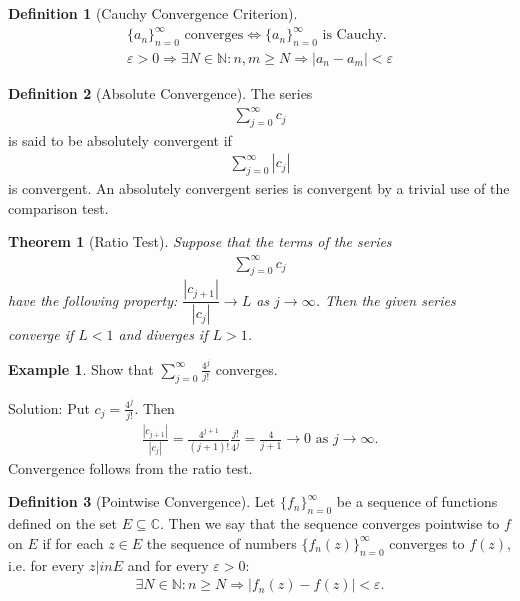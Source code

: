 \documentclass[12pt, a4paper]{article}
\theoremstyle{plain}
\newtheorem{thm}{Theorem} %
\theoremstyle{definition}
\newtheorem{definition}{Definition} %
\newtheorem{example}{Example} %
\begin{document}
			\begin{definition}[Cauchy Convergence Criterion]
				\begin{align*}
					\{a_n\}_{n=0}^{\infty}\text{ converges} \iff 
					\{a_n\}_{n=0}^{\infty}\text{ is Cauchy.}\\
					\varepsilon>0\Rightarrow \exists N\in \mathbb{N}: n,m\ge N \Rightarrow |a_n-a_m|<\varepsilon
				\end{align*}
			\end{definition}

			\begin{definition}[Absolute Convergence]
				The series
				\begin{align*}
					\sum\limits_{j=0}^{\infty}c_j
				\end{align*}
				is said to be absolutely convergent if
				\begin{align*}
					\sum\limits_{j=0}^{\infty}|c_j|
				\end{align*}
				is convergent. An absolutely convergent series is convergent by a trivial use of the comparison test.\\
			\end{definition}

			\begin{thm}[Ratio Test]
				Suppose that the terms of the series
				\begin{align*}
					\sum\limits_{j=0}^{\infty}c_j
				\end{align*}
				have the following property: $\dfrac{|c_{j+1}|}{|c_j|}\to L$ as $j\to\infty$. Then the given series converge if $L<1$ and diverges if $L>1$.
			\end{thm}

			\begin{example}
				Show that $\displaystyle\sum\limits_{j=0}^{\infty}\frac{4^j}{j!}$ converges.

				Solution: Put $c_j = \frac{4^j}{j!}$. Then
				\begin{align*}
					\frac{|c_{j+1}|}{|c_j|} = \frac{4^{j+1}}{(j+1)!}\frac{j!}{4^j} = \frac{4}{j+1}\to 0\text{ as }j\to\infty.
				\end{align*}
				Convergence follows from the ratio test.\\
			\end{example}

			\begin{definition}[Pointwise Convergence]
				Let $\{f_n\}_{n=0}^{\infty}$ be a sequence of functions defined on the set $E\subseteq \mathbb{C}$. Then we say that the sequence converges pointwise to $f$ on $E$ if for each $z\in E$ the sequence of numbers $\{f_n(z)\}_{n=0}^{\infty}$ converges to $f(z)$, i.e. for every $z|in E$ and for every $\varepsilon>0$:
				\begin{align*}
					\exists N\in \mathbb{N}: n\ge N \Rightarrow |f_n(z)-f(z)|<\varepsilon.
				\end{align*}
			\end{definition}
\end{document}
